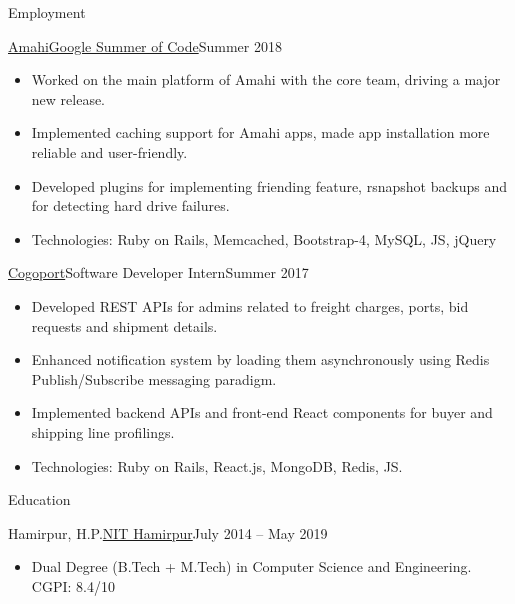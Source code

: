 \documentclass[]{mcdowellcv}
\begin{document}
	\makeheader
	
	\begin{cvsection}{Employment}
		\begin{cvsubsection}{\href {https://summerofcode.withgoogle.com/projects/\#6139448354406400}{Amahi}}{\href {https://summerofcode.withgoogle.com/}{Google Summer of Code}}{Summer 2018}
			\begin{itemize}
				\item Worked on the main platform of Amahi with the core team, driving a major new release.
				\item Implemented caching support for Amahi apps, made app installation more reliable and user-friendly.
				\item Developed plugins for implementing friending feature, rsnapshot backups and for detecting hard drive failures.
				\item Technologies: Ruby on Rails,  Memcached, Bootstrap-4, MySQL, JS, jQuery
			\end{itemize}
		\end{cvsubsection}
		\begin{cvsubsection}{\href {http://www.cogoport.com/}{Cogoport}}{Software Developer Intern}{Summer 2017}			
			\begin{itemize}
				\item Developed REST APIs for admins related to freight charges, ports, bid requests and shipment details.
				\item Enhanced notification system by loading them asynchronously using Redis Publish/Subscribe messaging paradigm.
				\item Implemented backend APIs and front-end React components for buyer and shipping line profilings.
				\item Technologies: Ruby on Rails, React.js, MongoDB, Redis, JS.
			\end{itemize}
		\end{cvsubsection}
	\end{cvsection}
	
	\begin{cvsection}{Education}
		\begin{cvsubsection}{Hamirpur, H.P.}{\href {http://nith.ac.in/}{NIT Hamirpur}}{July 2014 -- May 2019}
			\begin{itemize}
				\item Dual Degree (B.Tech + M.Tech) in Computer Science and Engineering. CGPI: 8.4/10
			\end{itemize}
		\end{cvsubsection}
	\end{cvsection}
	
\end{document}
